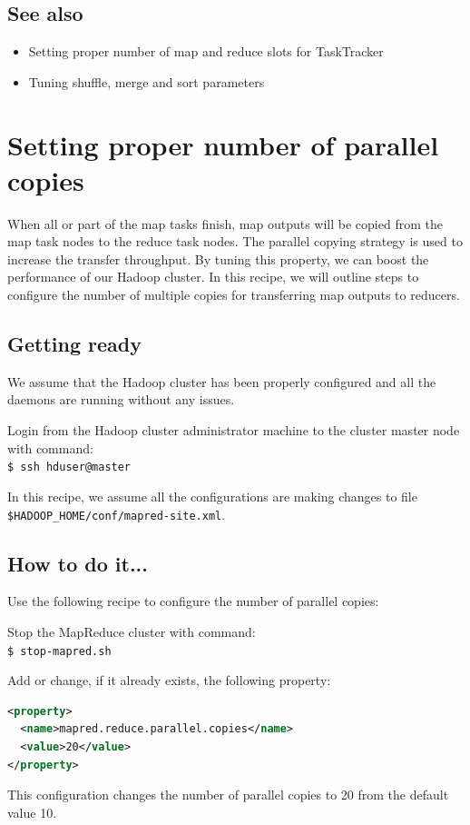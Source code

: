\subsection*{See also}
\begin{itemize}
  \item Setting proper number of map and reduce slots for TaskTracker
  \item Tuning shuffle, merge and sort parameters
\end{itemize}

\section{Setting proper number of parallel copies}
When all or part of the map tasks finish, map outputs will be copied from the map task nodes to the reduce task nodes. The parallel copying strategy is used to increase the transfer throughput. By tuning this property, we can boost the performance of our Hadoop cluster. In this recipe, we will outline steps to configure the number of multiple copies for transferring map outputs to reducers.
\subsection*{Getting ready}
We assume that the Hadoop cluster has been properly configured and all the daemons are running without any issues.

Login from the Hadoop cluster administrator machine to the cluster master node with command: \\
\verb|$ ssh hduser@master|

In this recipe, we assume all the configurations are making changes to file \verb|$HADOOP_HOME/conf/mapred-site.xml|.
\subsection*{How to do it...}
Use the following recipe to configure the number of parallel copies:

Stop the MapReduce cluster with command: \\
\verb|$ stop-mapred.sh|

Add or change, if it already exists, the following property:
\lstset{style=bashstyle}
\begin{lstlisting}[language=XML]
<property>
  <name>mapred.reduce.parallel.copies</name>
  <value>20</value>
</property>
\end{lstlisting}

This configuration changes the number of parallel copies to 20 from the default value 10.

